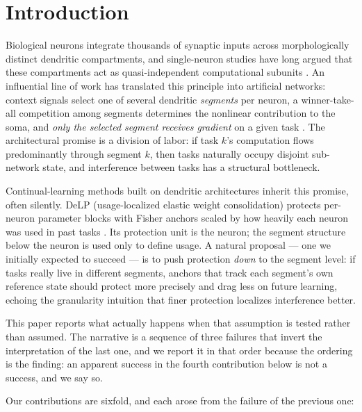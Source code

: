 \documentclass[review,12pt,number]{elsarticle}
\newcommand{\delp}{DeLP}
\begin{document}
\linenumbers

\section{Introduction}
\label{sec:intro}

Biological neurons integrate thousands of synaptic inputs across morphologically
distinct dendritic compartments, and single-neuron studies have long argued
that these compartments act as quasi-independent computational subunits
\cite{poirazi2003,london2005,poirazi2020}. An influential line of work has
translated this principle into artificial networks: context signals select
one of several dendritic \emph{segments} per neuron, a winner-take-all
competition among segments determines the nonlinear contribution to the
soma, and \emph{only the selected segment receives gradient} on a given task
\cite{iyer2022}. The architectural promise is a division of labor: if task
$k$'s computation flows predominantly through segment $k$, then tasks
naturally occupy disjoint sub-network state, and interference between tasks
has a structural bottleneck.

Continual-learning methods built on dendritic architectures inherit this
promise, often silently. \delp{} (usage-localized elastic weight
consolidation) protects per-neuron parameter blocks with Fisher anchors
scaled by how heavily each neuron was used in past tasks
\cite{zhou2026delp,kirkpatrick2017}. Its protection unit is the neuron; the
segment structure below the neuron is used only to define usage. A natural
proposal --- one we initially expected to succeed --- is to push protection
\emph{down} to the segment level: if tasks really live in different segments,
anchors that track each segment's own reference state should protect more
precisely and drag less on future learning, echoing the granularity
intuition that finer protection localizes interference better.

This paper reports what actually happens when that assumption is tested
rather than assumed. The narrative is a sequence of three failures that
invert the interpretation of the last one, and we report it in that order
because the ordering is the finding: an apparent success in the fourth
contribution below is not a success, and we say so.

Our contributions are sixfold, and each arose from the failure of the
previous one:
\end{document}
